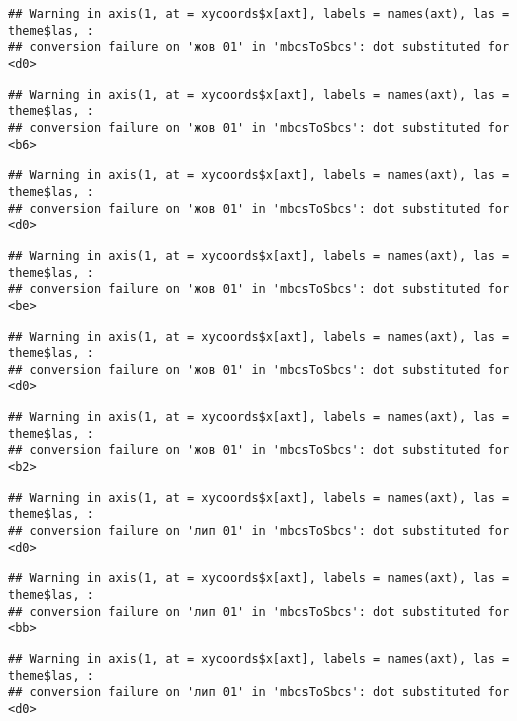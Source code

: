 \documentclass[]{article}
\begin{document}
\begin{verbatim}
## Warning in axis(1, at = xycoords$x[axt], labels = names(axt), las = theme$las, :
## conversion failure on 'жов 01' in 'mbcsToSbcs': dot substituted for <d0>
\end{verbatim}

\begin{verbatim}
## Warning in axis(1, at = xycoords$x[axt], labels = names(axt), las = theme$las, :
## conversion failure on 'жов 01' in 'mbcsToSbcs': dot substituted for <b6>
\end{verbatim}

\begin{verbatim}
## Warning in axis(1, at = xycoords$x[axt], labels = names(axt), las = theme$las, :
## conversion failure on 'жов 01' in 'mbcsToSbcs': dot substituted for <d0>
\end{verbatim}

\begin{verbatim}
## Warning in axis(1, at = xycoords$x[axt], labels = names(axt), las = theme$las, :
## conversion failure on 'жов 01' in 'mbcsToSbcs': dot substituted for <be>
\end{verbatim}

\begin{verbatim}
## Warning in axis(1, at = xycoords$x[axt], labels = names(axt), las = theme$las, :
## conversion failure on 'жов 01' in 'mbcsToSbcs': dot substituted for <d0>
\end{verbatim}

\begin{verbatim}
## Warning in axis(1, at = xycoords$x[axt], labels = names(axt), las = theme$las, :
## conversion failure on 'жов 01' in 'mbcsToSbcs': dot substituted for <b2>
\end{verbatim}

\begin{verbatim}
## Warning in axis(1, at = xycoords$x[axt], labels = names(axt), las = theme$las, :
## conversion failure on 'лип 01' in 'mbcsToSbcs': dot substituted for <d0>
\end{verbatim}

\begin{verbatim}
## Warning in axis(1, at = xycoords$x[axt], labels = names(axt), las = theme$las, :
## conversion failure on 'лип 01' in 'mbcsToSbcs': dot substituted for <bb>
\end{verbatim}

\begin{verbatim}
## Warning in axis(1, at = xycoords$x[axt], labels = names(axt), las = theme$las, :
## conversion failure on 'лип 01' in 'mbcsToSbcs': dot substituted for <d0>
\end{verbatim}
\end{document}
